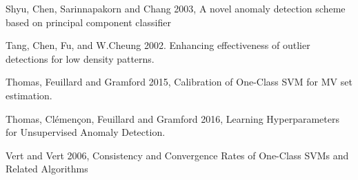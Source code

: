 \documentclass[9pt]{beamer}
\begin{document}
\begin{frame}
\begin{itemize}
{\item Shyu, Chen, Sarinnapakorn and Chang 2003, A novel anomaly detection scheme based on principal component classifier

\item Tang, Chen, Fu, and W.Cheung 2002. Enhancing effectiveness of outlier detections for low density patterns.

\item Thomas, Feuillard and Gramford 2015, Calibration of One-Class SVM for MV set estimation.

\item Thomas, Clémençon, Feuillard and Gramford 2016, Learning Hyperparameters for Unsupervised Anomaly Detection.

\item Vert and Vert 2006, Consistency and Convergence Rates of One-Class SVMs and Related Algorithms
}
\end{itemize}
\end{frame}
\end{document}
